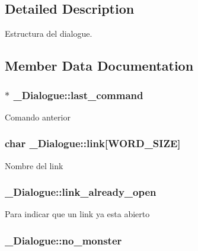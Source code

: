\subsection{Detailed Description}
Estructura del dialogue. 

\subsection{Member Data Documentation}
\hypertarget{struct__Dialogue_ad4340f1881243b083535594a283a864b}{
\subsubsection[{last\+\_\+command}]{$\ast$ \+\_\+\+Dialogue\+::last\+\_\+command}}\label{struct__Dialogue_ad4340f1881243b083535594a283a864b}
Comando anterior \hypertarget{struct__Dialogue_adfdfa42510a4f6bccc37d7250529574d}{
\subsubsection[{link}]{\setlength{\rightskip}{0pt plus 5cm}char \+\_\+\+Dialogue\+::link\mbox{[}{\bf W\+O\+R\+D\+\_\+\+S\+I\+Z\+E}\mbox{]}}}\label{struct__Dialogue_adfdfa42510a4f6bccc37d7250529574d}
Nombre del link \hypertarget{struct__Dialogue_a2334a9bb36055478553f576db1c91a54}{
\subsubsection[{link\+\_\+already\+\_\+open}]{ \+\_\+\+Dialogue\+::link\+\_\+already\+\_\+open}}\label{struct__Dialogue_a2334a9bb36055478553f576db1c91a54}
Para indicar que un link ya esta abierto \hypertarget{struct__Dialogue_ab41d3ec815fc544944f1edb5e9f158a6}{
\subsubsection[{no\+\_\+monster}]{ \+\_\+\+Dialogue\+::no\+\_\+monster}}\label{struct__Dialogue_ab41d3ec815fc544944f1edb5e9f158a6}
